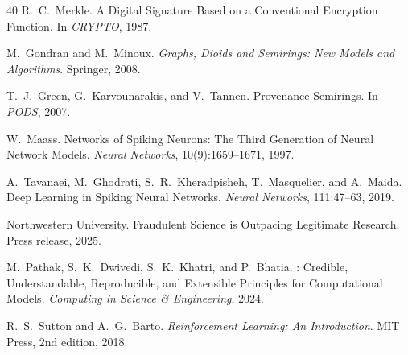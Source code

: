 \documentclass[sigchi-a]{acmart}
\begin{document}
\begin{thebibliography}{40}
R.~C.~Merkle.
\newblock A Digital Signature Based on a Conventional Encryption Function.
\newblock In \emph{CRYPTO}, 1987.


M.~Gondran and M.~Minoux.
\newblock \emph{Graphs, Dioids and Semirings: New Models and Algorithms}.
\newblock Springer, 2008.

T.~J.~Green, G.~Karvounarakis, and V.~Tannen.
\newblock Provenance Semirings.
\newblock In \emph{PODS}, 2007.


W.~Maass.
\newblock Networks of Spiking Neurons: The Third Generation of Neural
  Network Models.
\newblock \emph{Neural Networks}, 10(9):1659--1671, 1997.

A.~Tavanaei, M.~Ghodrati, S.~R.~Kheradpisheh, T.~Masquelier, and A.~Maida.
\newblock Deep Learning in Spiking Neural Networks.
\newblock \emph{Neural Networks}, 111:47--63, 2019.


{Northwestern University}.
\newblock Fraudulent Science is Outpacing Legitimate Research.
\newblock Press release, 2025.

M.~Pathak, S.~K.~Dwivedi, S.~K.~Khatri, and P.~Bhatia.
: Credible, Understandable, Reproducible, and Extensible
  Principles for Computational Models.
\newblock \emph{Computing in Science \& Engineering}, 2024.


R.~S.~Sutton and A.~G.~Barto.
\newblock \emph{Reinforcement Learning: An Introduction}.
\newblock MIT Press, 2nd edition, 2018.

\end{thebibliography}
\fi
\end{document}
